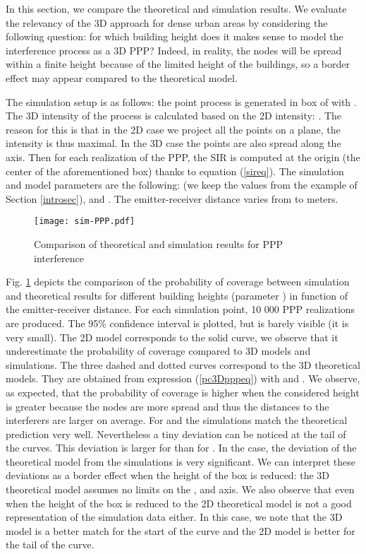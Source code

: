 \documentclass{sig-alternate-05-2015}
\begin{document}
In this section, we compare the theoretical and simulation results. We evaluate the relevancy of the 3D approach for dense urban areas by considering the following question: for which building height does it makes sense to model the interference process as a 3D PPP? Indeed, in reality, the nodes will be spread within a finite height because of the limited height of the buildings, so a border effect may appear compared to the theoretical model.

The simulation setup is as follows: the point process is generated in box of  with . The 3D intensity of the process is calculated based on the 2D intensity: . The reason for this is that in the 2D case we project all the points on a plane, the intensity is thus maximal. In the 3D case the points are also spread along the  axis. Then for each realization of the PPP, the SIR is computed at the origin (the center of the aforementioned box) thanks to equation (\ref{sireq}). The simulation and model parameters are the following:  (we keep the values from the example of Section \ref{introsec}),  and . The emitter-receiver distance  varies from  to  meters. 

\begin{figure}[ht]
  \centering
  \texttt{[image: sim-PPP.pdf]}
  \caption{Comparison of theoretical and simulation results for PPP interference}
  \label{simpppfig}
\end{figure}

Fig. \ref{simpppfig} depicts the comparison of the probability of coverage  between simulation and theoretical results for different building heights (parameter ) in function of the emitter-receiver distance. For each simulation point, 10 000 PPP realizations are produced. The 95\% confidence interval is plotted, but is barely visible (it is very small). The 2D model corresponds to the solid curve, we observe that it underestimate the probability of coverage compared to 3D models and simulations. The three dashed and dotted curves correspond to the 3D theoretical models. They are obtained from expression (\ref{pc3Dpppeq}) with  and . We observe, as expected, that the probability of coverage is higher when the considered height  is greater because the nodes are more spread and thus the distances to the interferers are larger on average. For  and  the simulations match the theoretical prediction very well. Nevertheless a tiny deviation can be noticed at the tail of the curves. This deviation is larger for  than for . In the  case, the deviation of the theoretical model from the simulations is very significant. We can interpret these deviations as a border effect when the height of the box is reduced: the 3D theoretical model assumes no limits on the ,  and  axis. We also observe that even when the height of the box is reduced to  the 2D theoretical model is not a good representation of the simulation data either. In this case, we note that the 3D model is a better match for the start of the curve and the 2D model is better for the tail of the curve.
\end{document}
